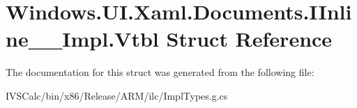 \hypertarget{struct_windows_1_1_u_i_1_1_xaml_1_1_documents_1_1_i_inline_____impl_1_1_vtbl}{}\section{Windows.\+U\+I.\+Xaml.\+Documents.\+I\+Inline\+\_\+\+\_\+\+Impl.\+Vtbl Struct Reference}
\label{struct_windows_1_1_u_i_1_1_xaml_1_1_documents_1_1_i_inline_____impl_1_1_vtbl}


The documentation for this struct was generated from the following file\+:\begin{DoxyCompactItemize}
\item 
I\+V\+S\+Calc/bin/x86/\+Release/\+A\+R\+M/ilc/Impl\+Types.\+g.\+cs\end{DoxyCompactItemize}

